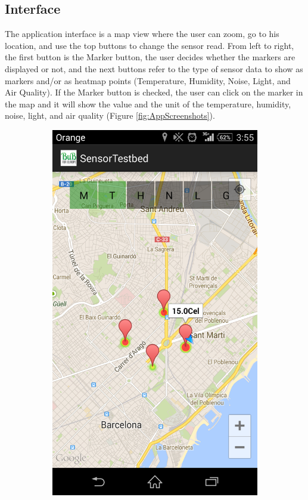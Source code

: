 \documentclass[12pt, a4paper,twoside]{tesi_upf}
\begin{document}
    \subsection{Interface}
      The application interface is a map view where the user can zoom, go to his location, and use the top buttons to change the sensor read. From left to right, the first button is the Marker button, the user decides whether the markers are displayed or not, and the next buttons refer to the type of sensor data to show as markers and/or as heatmap points (Temperature, Humidity, Noise, Light, and Air Quality).
      If the Marker button is checked, the user can click on the marker in the map and it will show the value and the unit of the temperature, humidity, noise, light, and air quality  (Figure \ref{fig:AppScreenshots}).
      \begin{figure}
        \centering
        \begin{subfigure}[b]{0.3\textwidth}
                \includegraphics[width=\textwidth]{./Figures/App_Screenshot_1.png}

\end{subfigure}
\end{figure}
\end{document}
